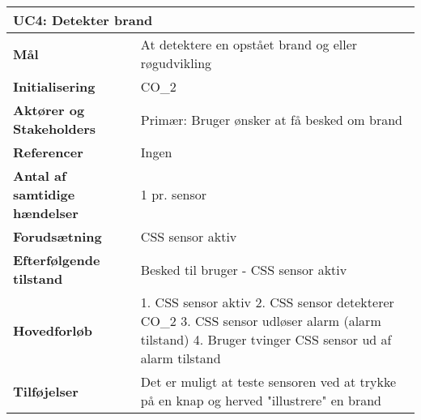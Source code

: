 \begin{table}[H] \centering
\begin{tabular}{|p{6cm}|p{8cm}|}
	\hline
\multicolumn{2}{|l|}{\textbf{UC4: Detekter brand}} \\\hline
\textbf{Mål}								&At detektere en opstået brand og eller røgudvikling \\\hline
\textbf{Initialisering}					& CO_2 \\\hline
\textbf{Aktører og Stakeholders}			&Primær: Bruger ønsker at få besked om brand \\\hline
\textbf{Referencer}						& Ingen \\\hline
\textbf{Antal af samtidige hændelser}	& 1 pr. sensor \\\hline
\textbf{Forudsætning}					& CSS sensor aktiv  \\\hline
\textbf{Efterfølgende tilstand}			& Besked til bruger - CSS sensor aktiv \\\hline
\textbf{Hovedforløb}						&  1. CSS sensor aktiv 2. CSS sensor detekterer CO_2  3. CSS sensor udløser alarm (alarm tilstand) 4. Bruger tvinger CSS sensor ud af alarm tilstand\\\hline
\textbf{Tilføjelser}						& Det er muligt at teste sensoren ved at trykke på en knap og herved "illustrere" en brand  \\\hline
	\end{tabular}
	\label{UC4} 
\end{table}